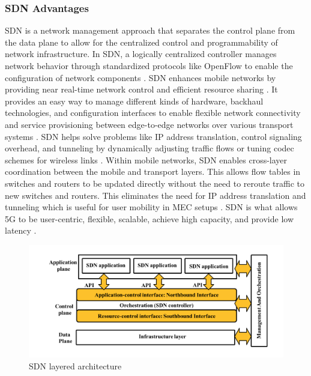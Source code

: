 \documentclass[acmtog]{acmart}
\begin{document}
\subsubsection{SDN Advantages} SDN is a network management approach that separates the control plane from the data plane to allow for the centralized control and programmability of network infrastructure. In SDN, a logically centralized controller manages network behavior through standardized protocols like OpenFlow to enable the configuration of network components \cite{ref3}. SDN enhances mobile networks by providing near real-time network control and efficient resource sharing \cite{ref6_1}. It provides an easy way to manage different kinds of hardware, backhaul technologies, and configuration interfaces to enable flexible network connectivity and service provisioning between edge-to-edge networks over various transport systems \cite{ref6_1}. SDN helps solve problems like IP address translation, control signaling overhead, and tunneling by dynamically adjusting traffic flows or tuning codec schemes for wireless links \cite{ref6_1}. Within mobile networks, SDN enables cross-layer coordination between the mobile and transport layers. This allows flow tables in switches and routers to be updated directly without the need to reroute traffic to new switches and routers. This eliminates the need for IP address translation and tunneling which is useful for user mobility in MEC setups \cite{ref6_1}. SDN is what allows 5G to be user-centric, flexible, scalable, achieve high capacity, and provide low latency \cite{ref6}.
\begin{figure}[h]
  \centering
  \includegraphics[width=\linewidth]{sdn.png}
  \caption{SDN layered architecture \cite{ref7_1}}
\end{figure}
\end{document}
